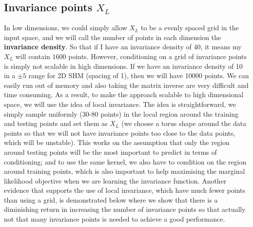 \documentclass{statsmsc}
\begin{document}
\subsection*{Invariance points $X_L$}
In low dimensions, we could simply allow $X_L$ to be a evenly spaced grid in the input space, and we will call the number of points in each dimension the \textbf{invariance density}.
So that if I have an invariance density of $40$, it means my $X_L$ will contain $1600$ points. 
However, conditioning on a grid of invariance points is simply not scalable in high dimensions. 
If we have an invariance density of 10 in a $\pm 5$ range for 2D SHM (spacing of 1), then we will have 10000 points. 
We can easily run out of memory and also taking the matrix inverse are very difficult and time consuming.
As a result, to make the approach scalable to high dimensional space, we will use the idea of local invariance. 
The idea is straightforward, we simply sample uniformly (30-80 points) in the local region around the training and testing points and set them as $X_L$ (we choose a torus shape around the data points so that we will not have invariance points too close to the data points, which will be unstable).
This works on the assumption that only the region around testing points will be the most important to predict in terms of conditioning; and to use the same kernel, we also have to condition on the region around training points, which is also important to help maximising the marginal likelihood objective when we are learning the invariance function.
Another evidence that supports the use of local invariance, which have much fewer points than using a grid, is demonstrated below where we show that there is a diminishing return in increasing the number of invariance points so that actually not that many invariance points is needed to achieve a good performance. 
\end{document}
